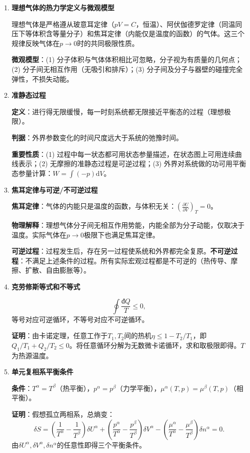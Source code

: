\documentclass[12pt,a4paper,fontset=mac]{ctexart}
\newcommand{\dd}{\mathrm{d}}
\newcommand{\đ}{\mathrm{đ}}
\begin{document}
\begin{enumerate}

\item \textbf{理想气体的热力学定义与微观模型}

理想气体是严格遵从玻意耳定律（$pV=C$，恒温）、阿伏伽德罗定律（同温同压下等体积含等量分子）和焦耳定律（内能仅是温度的函数）的气体。这三个规律反映气体在$p\to0$时的共同极限性质。

\textbf{微观模型}：(1) 分子体积与气体体积相比可忽略，分子视为有质量的几何点；(2) 分子间无相互作用（无吸引和排斥）；(3) 分子间及分子与器壁的碰撞完全弹性，不损失动能。

\item \textbf{准静态过程}

\textbf{定义}：进行得无限缓慢，每一时刻系统都无限接近平衡态的过程（理想极限）。

\textbf{判据}：外界参数变化的时间尺度远大于系统的弛豫时间。

\textbf{重要性质}：(1) 过程中每一状态都可用状态参量描述，在状态图上可用连续曲线表示；(2) 无摩擦的准静态过程是可逆过程；(3) 外界对系统做的功可用平衡态参量计算：$W=\int(-p)\dd V$。

\item \textbf{焦耳定律与可逆/不可逆过程}

\textbf{焦耳定律}：气体的内能只是温度的函数，与体积无关：$\left(\frac{\partial U}{\partial V}\right)_T=0$。

\textbf{物理解释}：理想气体分子间无相互作用势能，内能全部为分子动能，仅取决于温度。实际气体在$p\to0$极限下也满足焦耳定律。

\textbf{可逆过程}：过程发生后，存在另一过程使系统和外界都完全复原。\textbf{不可逆过程}：不满足上述条件的过程。所有实际宏观过程都是不可逆的（热传导、摩擦、扩散、自由膨胀等）。

\item \textbf{克劳修斯等式和不等式}

\[\oint\frac{\đ Q}{T}\le0,\]
等号对应可逆循环，不等号对应不可逆循环。

\textbf{证明}：由卡诺定理，任意工作于$T_1,T_2$间的热机$\eta\le1-T_2/T_1$，即$Q_1/T_1+Q_2/T_2\le0$。将任意循环分解为无数微卡诺循环，求和取极限即得。$T$为热源温度。

\item \textbf{单元复相系平衡条件}

\textbf{条件}：$T^\alpha=T^\beta$（热平衡），$p^\alpha=p^\beta$（力学平衡），$\mu^\alpha(T,p)=\mu^\beta(T,p)$（相平衡）。

\textbf{证明}：假想孤立两相系，总熵变：
\[\delta S=\left(\frac{1}{T^\alpha}-\frac{1}{T^\beta}\right)\delta U^\alpha+\left(\frac{p^\alpha}{T^\alpha}-\frac{p^\beta}{T^\beta}\right)\delta V^\alpha-\left(\frac{\mu^\alpha}{T^\alpha}-\frac{\mu^\beta}{T^\beta}\right)\delta n^\alpha=0.\]
由$\delta U^\alpha,\delta V^\alpha,\delta n^\alpha$的任意性即得三个平衡条件。


\end{enumerate}
\end{document}
